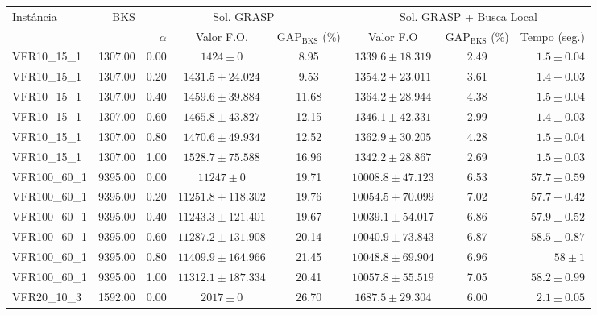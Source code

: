 \begin{longtable}{lrrccccr}
\toprule
\multirow{2}{*}{Instância} & \multirow{2}{*}{BKS} & \multicolumn{3}{c}{Sol.
GRASP} & \multicolumn{3}{c}{Sol. GRASP + Busca Local}\\ \cmidrule(r){3-5}
\cmidrule(l){6-8}
& & $\alpha$ & Valor F.O. & GAP$_\mathrm{BKS}$ (\%) & Valor F.O &
GAP$_\mathrm{BKS}$ (\%) & Tempo (seg.) \\ 
\midrule
\endhead

\bottomrule
\endfoot


 VFR10\_15\_1 & 1307.00 & 0.00 & $1424 \pm 0$ & 8.95 & $1339.6 \pm 18.319$ & 2.49 & $1.5 \pm 0.04$ \\ 
  VFR10\_15\_1 & 1307.00 & 0.20 & $1431.5 \pm 24.024$ & 9.53 & $1354.2 \pm 23.011$ & 3.61 & $1.4 \pm 0.03$ \\ 
  VFR10\_15\_1 & 1307.00 & 0.40 & $1459.6 \pm 39.884$ & 11.68 & $1364.2 \pm 28.944$ & 4.38 & $1.5 \pm 0.04$ \\ 
  VFR10\_15\_1 & 1307.00 & 0.60 & $1465.8 \pm 43.827$ & 12.15 & $1346.1 \pm 42.331$ & 2.99 & $1.4 \pm 0.03$ \\ 
  VFR10\_15\_1 & 1307.00 & 0.80 & $1470.6 \pm 49.934$ & 12.52 & $1362.9 \pm 30.205$ & 4.28 & $1.5 \pm 0.04$ \\ 
  VFR10\_15\_1 & 1307.00 & 1.00 & $1528.7 \pm 75.588$ & 16.96 & $1342.2 \pm 28.867$ & 2.69 & $1.5 \pm 0.03$ \\ 
   \midrule
VFR100\_60\_1 & 9395.00 & 0.00 & $11247 \pm 0$ & 19.71 & $10008.8 \pm 47.123$ & 6.53 & $57.7 \pm 0.59$ \\ 
  VFR100\_60\_1 & 9395.00 & 0.20 & $11251.8 \pm 118.302$ & 19.76 & $10054.5 \pm 70.099$ & 7.02 & $57.7 \pm 0.42$ \\ 
  VFR100\_60\_1 & 9395.00 & 0.40 & $11243.3 \pm 121.401$ & 19.67 & $10039.1 \pm 54.017$ & 6.86 & $57.9 \pm 0.52$ \\ 
  VFR100\_60\_1 & 9395.00 & 0.60 & $11287.2 \pm 131.908$ & 20.14 & $10040.9 \pm 73.843$ & 6.87 & $58.5 \pm 0.87$ \\ 
  VFR100\_60\_1 & 9395.00 & 0.80 & $11409.9 \pm 164.966$ & 21.45 & $10048.8 \pm 69.904$ & 6.96 & $58 \pm 1$ \\ 
  VFR100\_60\_1 & 9395.00 & 1.00 & $11312.1 \pm 187.334$ & 20.41 & $10057.8 \pm 55.519$ & 7.05 & $58.2 \pm 0.99$ \\ 
   \midrule
VFR20\_10\_3 & 1592.00 & 0.00 & $2017 \pm 0$ & 26.70 & $1687.5 \pm 29.304$ & 6.00 & $2.1 \pm 0.05$ \\ 

\end{longtable}
